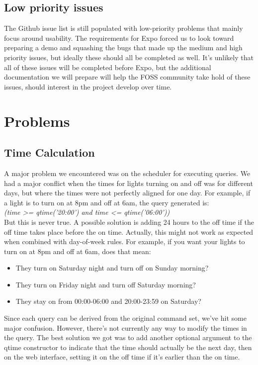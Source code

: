 \documentclass[10pt,draftclsnofoot,onecolumn]{IEEEtran}
\begin{document}
\subsection{Low priority issues}
The Github issue list is still populated with low-priority problems that 
mainly focus around usability. The requirements for Expo forced us to look toward
preparing a demo and squashing the bugs that made up the medium and high priority 
issues, but ideally these should all be completed as well. It's unlikely that all of 
these issues will be completed before Expo, but the additional documentation we will
prepare will help the FOSS community take hold of these issues, should interest in the
project develop over time.

\section{Problems}
\subsection{Time Calculation}
A major problem we encountered was on the scheduler for executing queries. We had a major conflict when the times for lights turning on and off was for different days, but where the times were not perfectly aligned for one day. For example, if a light is to turn on at 8pm and off at 6am, the query generated is:\\
\textit{(time \textgreater= qtime('20:00') and time \textless= qtime('06:00'))}\\
But this is never true. A possible solution is adding 24 hours to the off time if the off time takes place before the on time. Actually, this might not work as expected when combined with day-of-week rules. For example, if you want your lights to turn on at 8pm and off at 6am, does that mean:

 \begin{itemize}
 \item They turn on Saturday night and turn off on Sunday morning?
 \item They turn on Friday night and turn off Saturday morning?
 \item They stay on from 00:00-06:00 and 20:00-23:59 on Saturday?
 \end{itemize}

 Since each query can be derived from the original command set, we've hit some major confusion. However, there's not currently any way to modify the times in the query. 
The best solution we got was to add another optional argument to the qtime constructor to indicate that the time should actually be the next day, then on the web interface, setting it on the off time if it's earlier than the on time.
\end{document}

